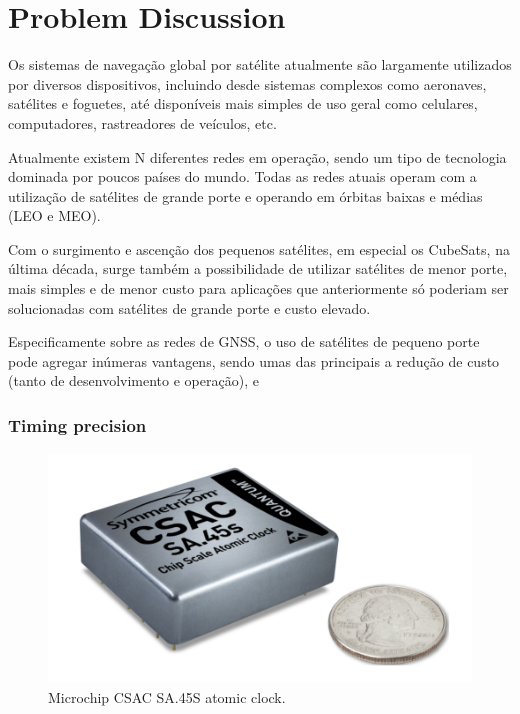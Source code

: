 %
%
%
%
%

%
%
%
%
%


\chapter{Problem Discussion} \label{ch:problem-discussion}

Os sistemas de navegação global por satélite atualmente são largamente utilizados por diversos dispositivos, incluindo desde sistemas complexos como aeronaves, satélites e foguetes, até disponíveis mais simples de uso geral como celulares, computadores, rastreadores de veículos, etc.

Atualmente existem N diferentes redes em operação, sendo um tipo de tecnologia dominada por poucos países do mundo. Todas as redes atuais operam com a utilização de satélites de grande porte e operando em órbitas baixas e médias (LEO e MEO).

Com o surgimento e ascenção dos pequenos satélites, em especial os CubeSats, na última década, surge também a possibilidade de utilizar satélites de menor porte, mais simples e de menor custo para aplicações que anteriormente só poderiam ser solucionadas com satélites de grande porte e custo elevado.

Especificamente sobre as redes de GNSS, o uso de satélites de pequeno porte pode agregar inúmeras vantagens, sendo umas das principais a redução de custo (tanto de desenvolvimento e operação), e 

\subsection{Timing precision}

\cite{sa45s}

\begin{figure}[!ht]
    \begin{center}
        \includegraphics[width=0.7\columnwidth]{figures/microchip-csac}
        \caption{Microchip CSAC SA.45S atomic clock.}
        \label{fig:microchip-csac}
    \end{center}
\end{figure}

